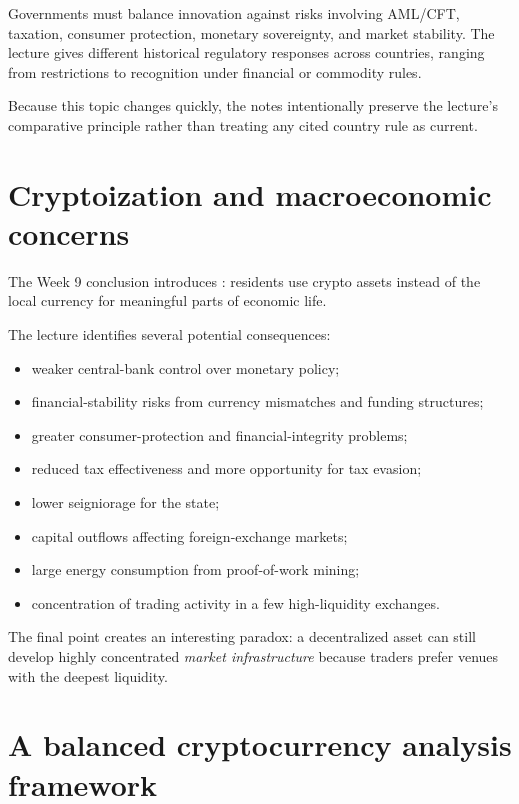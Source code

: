 Governments must balance innovation against risks involving AML/CFT, taxation, consumer protection, monetary sovereignty, and market stability. The lecture gives different historical regulatory responses across countries, ranging from restrictions to recognition under financial or commodity rules.

Because this topic changes quickly, the notes intentionally preserve the lecture's comparative principle rather than treating any cited country rule as current.

\section{Cryptoization and macroeconomic concerns}

The Week 9 conclusion introduces : residents use crypto assets instead of the local currency for meaningful parts of economic life.

The lecture identifies several potential consequences:

\begin{itemize}
  \item weaker central-bank control over monetary policy;
  \item financial-stability risks from currency mismatches and funding structures;
  \item greater consumer-protection and financial-integrity problems;
  \item reduced tax effectiveness and more opportunity for tax evasion;
  \item lower seigniorage for the state;
  \item capital outflows affecting foreign-exchange markets;
  \item large energy consumption from proof-of-work mining;
  \item concentration of trading activity in a few high-liquidity exchanges.
\end{itemize}

The final point creates an interesting paradox: a decentralized asset can still develop highly concentrated \emph{market infrastructure} because traders prefer venues with the deepest liquidity.

\section{A balanced cryptocurrency analysis framework}

